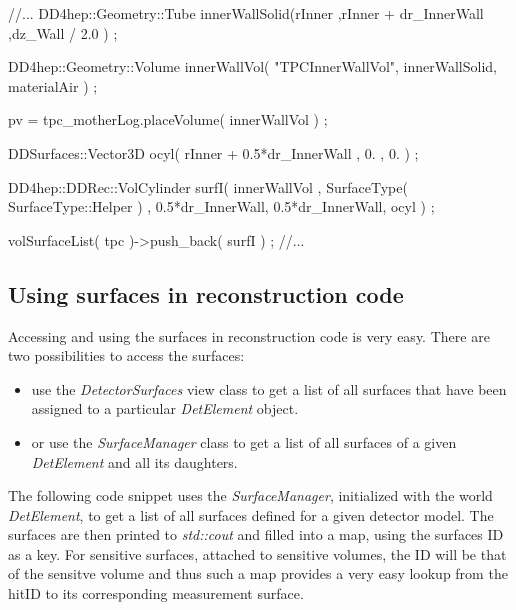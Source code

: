 \documentclass[10pt,a4paper]{article}
\begin{document}
\begin{code}
  //...
  DD4hep::Geometry::Tube innerWallSolid(rInner ,rInner + dr_InnerWall ,dz_Wall / 2.0 ) ;

  DD4hep::Geometry::Volume innerWallVol( "TPCInnerWallVol", innerWallSolid, materialAir ) ; 

  pv = tpc_motherLog.placeVolume( innerWallVol ) ;

  DDSurfaces::Vector3D ocyl(  rInner + 0.5*dr_InnerWall , 0. , 0. ) ;

  DD4hep::DDRec::VolCylinder surfI( innerWallVol , 
                                    SurfaceType( SurfaceType::Helper ) ,
                                    0.5*dr_InnerWall, 0.5*dr_InnerWall, 
                                    ocyl ) ;

  volSurfaceList( tpc )->push_back(  surfI ) ;
  //...
\end{code}




\subsection{Using surfaces in reconstruction code}
\label{subsec:ddrec-surfaces-reconstruction}
Accessing and using the surfaces in reconstruction code is very easy. 
There are two possibilities to access the surfaces:
\begin{itemize}
\item use the {\em DetectorSurfaces} view class to get a list of 
 all surfaces that have been assigned to a particular {\em DetElement}
 object.
\item or use the {\em SurfaceManager} class to get a list of all
 surfaces of a given {\em DetElement} and all its daughters.
\end{itemize}

\noindent
The following code snippet uses the {\em SurfaceManager}, initialized
with the world  {\em DetElement}, to get a list of all surfaces 
defined for a given detector model.
The surfaces are then printed to {\em std::cout} and filled 
into a map, using the surfaces ID as a key.
For sensitive surfaces, attached to sensitive volumes, the ID
will be that of the sensitve volume and thus such a map provides
a very easy lookup from the hitID to its corresponding measurement
surface.
\end{document}
